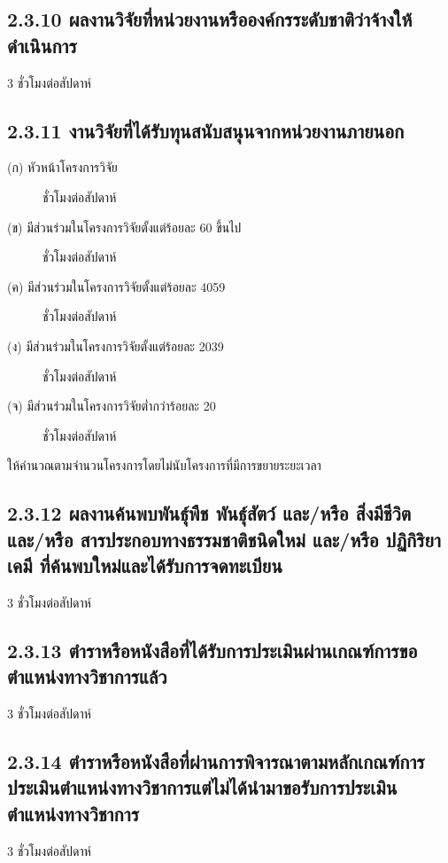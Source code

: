 \documentclass[a4paper,12pt,english]{sphinxmanual}
\begin{document}
\subsection{2.3.10 ผลงานวิจัยที่หน่วยงานหรือองค์กรระดับชาติว่าจ้างให้ดำเนินการ}
\label{\detokenize{2research:id20}}
3 ชั่วโมงต่อสัปดาห์


\subsection{2.3.11 งานวิจัยที่ได้รับทุนสนับสนุนจากหน่วยงานภายนอก}
\label{\detokenize{2research:id21}}\begin{description}
\item[{(ก) หัวหน้าโครงการวิจัย}]  ชั่วโมงต่อสัปดาห์

\item[{(ข) มีส่วนร่วมในโครงการวิจัยตั้งแต่ร้อยละ 60 ขึ้นไป}]  ชั่วโมงต่อสัปดาห์

\item[{(ค) มีส่วนร่วมในโครงการวิจัยตั้งแต่ร้อยละ 40\sphinxhyphen{}59}]  ชั่วโมงต่อสัปดาห์

\item[{(ง) มีส่วนร่วมในโครงการวิจัยตั้งแต่ร้อยละ 20\sphinxhyphen{}39}]  ชั่วโมงต่อสัปดาห์

\item[{(จ) มีส่วนร่วมในโครงการวิจัยต่ำกว่าร้อยละ 20}]  ชั่วโมงต่อสัปดาห์

\end{description}

ให้คำนวณตามจำนวนโครงการโดยไม่นับโครงการที่มีการขยายระยะเวลา


\subsection{2.3.12 ผลงานค้นพบพันธุ์พืช พันธุ์สัตว์ และ/หรือ สิ่งมีชีวิต และ/หรือ สารประกอบทางธรรมชาติชนิดใหม่ และ/หรือ ปฏิกิริยาเคมี ที่ค้นพบใหม่และได้รับการจดทะเบียน}
\label{\detokenize{2research:id22}}
3 ชั่วโมงต่อสัปดาห์


\subsection{2.3.13 ตำราหรือหนังสือที่ได้รับการประเมินผ่านเกณฑ์การขอตำแหน่งทางวิชาการแล้ว}
\label{\detokenize{2research:id23}}
3 ชั่วโมงต่อสัปดาห์


\subsection{2.3.14 ตำราหรือหนังสือที่ผ่านการพิจารณาตามหลักเกณฑ์การประเมินตำแหน่งทางวิชาการแต่ไม่ได้นำมาขอรับการประเมินตำแหน่งทางวิชาการ}
\label{\detokenize{2research:id24}}
3 ชั่วโมงต่อสัปดาห์
\end{document}
